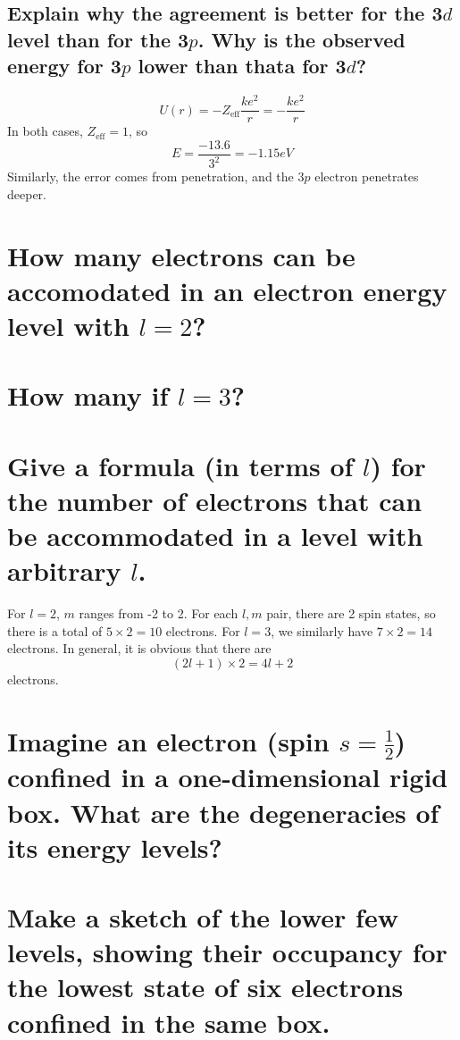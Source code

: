 \documentclass[answers]{exam}
\begin{document}
\begin{questions}
\begin{parts}
	\part{Explain why the agreement is better for the 3$d$ level than for the 3$p$. Why is the observed energy for 3$p$ lower than thata for 3$d$?}
\end{parts}

\begin{solution}
	$$U(r) = -Z_{\text{eff}}\frac{ke^2}{r} = -\frac{ke^2}{r}$$
	In both cases, $Z_{\text{eff}} = 1$, so
	$$E = \frac{-13.6}{3^2} = -1.15\si{eV}$$
	Similarly, the error comes from penetration, and the 3$p$ electron penetrates deeper.
\end{solution}

\begin{parts}
	\part{How many electrons can be accomodated in an electron energy level with $l=2$?}
	\part{How many if $l=3$?}
	\part{Give a formula (in terms of $l$) for the number of electrons that can be accommodated in a level with arbitrary $l$.}
\end{parts}

\begin{solution}
	For $l=2$, $m$ ranges from -2 to 2. For each $l,m$ pair, there are 2 spin states, so there is a total of $5\times2=10$ electrons. For $l=3$, we similarly have $7\times2=14$ electrons. In general, it is obvious that there are
	$$(2l+1)\times2 = 4l+2$$
	electrons.
\end{solution}

\question{}

\begin{parts}
	\part{Imagine an electron (spin $s=\frac{1}{2}$) confined in a one-dimensional rigid box. What are the degeneracies of its energy levels?}
\part{Make a sketch of the lower few levels, showing their occupancy for the lowest state of six electrons confined in the same box.}
\end{parts}


\end{questions}
\end{document}
